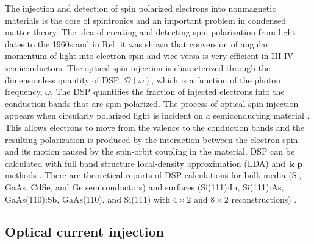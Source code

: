 \documentclass[pss]{wiley2sp} %
\begin{document}
The injection and detection of spin polarized electrons into nonmagnetic materials is the core of spintronics \cite{vzuticRMP04,fertRMP08} and an important  problem in condensed matter theory.
The idea of creating and detecting spin polarization from light dates to the 1960s \cite{LampelPRL68} and in Ref. \cite{dyakonovOO84} it was shown that conversion of angular momentum of light into electron spin and vice versa is very efficient in III-IV semiconductors. The optical spin injection is characterized through the dimensionless quantity of DSP, $\mathcal{D}(\omega)$, which is a function of the photon frequency, $\omega$. The DSP quantifies the fraction of injected electrons into the conduction bands that are spin polarized.
The process of optical spin injection appears when circularly polarized light is incident on a semiconducting material \cite{dyakonovOO84}. This allows electrons to move from the valence to the conduction bands and the resulting polarization is produced by the interaction between the electron spin and its motion caused by the spin-orbit coupling in the material. DSP can be calculated with full band structure local-density approximation (LDA) and $\textbf{k}\cdot\textbf{p}$ methods \cite{nastosPRB07,cabellosPRB09}. There are theoretical reports of DSP calculations for bulk media (Si, GaAs, CdSe, and Ge semiconductors) \cite{nastosPRB07,cabellosPRB09} and surfaces (Si(111):In, Si(111):As, GaAs(110):Sb, GaAs(110), and Si(111) with $4\times2$ and $8\times2$ reconstructions) \cite{mendozaPRB12,arzatePRB14}. 

\subsection{Optical current injection}
\end{document}
